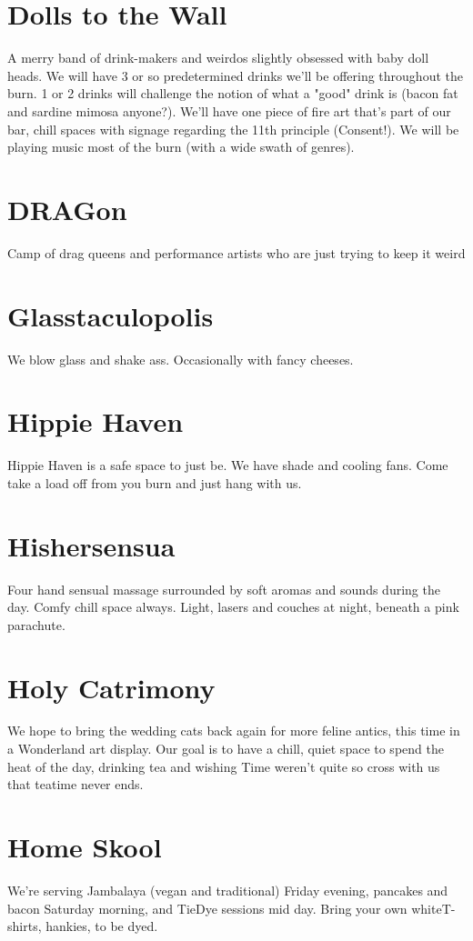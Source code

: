 \section*{Dolls to the Wall}
A merry band of drink-makers and weirdos slightly obsessed with baby doll heads. We will have 3 or so predetermined drinks we'll be offering throughout the burn. 1 or 2 drinks will challenge the notion of what a "good" drink is (bacon fat and sardine mimosa anyone?). We'll have one piece of fire art that's part of our bar, chill spaces with signage regarding the 11th principle (Consent!). We will be playing music most of the burn (with a wide swath of genres). 


\section*{DRAGon}
Camp of drag queens and performance artists who are just trying to keep it weird 


\section*{Glasstaculopolis}
We blow glass and shake ass. Occasionally with fancy cheeses. 


\section*{Hippie Haven}
Hippie Haven is a safe space to just be. We have shade and cooling fans. Come take a load off from you burn and just hang with us. 


\section*{Hishersensua}
Four hand sensual massage surrounded by soft aromas and sounds during the day. Comfy chill space always. Light, lasers and couches at night, beneath a pink parachute. 


\section*{Holy Catrimony}
We hope to bring the wedding cats back again for more feline antics, this time in a Wonderland art display. Our goal is to have a chill, quiet space to spend the heat of the day, drinking tea and wishing Time weren't quite so cross with us that teatime never ends. 


\section*{Home Skool}
We're serving Jambalaya (vegan and traditional) Friday evening, pancakes and bacon Saturday morning, and TieDye sessions mid day. Bring your own whiteT-shirts, hankies, to be dyed. 


